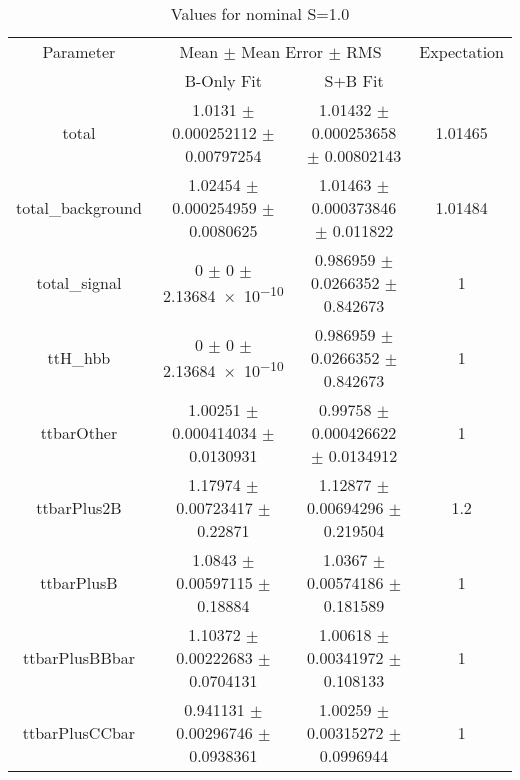 \begin{table}
\centering
\caption{Values for nominal S=1.0}
\begin{tabular}{cccc}
\toprule
Parameter & \multicolumn{2}{c}{Mean $\pm$ Mean Error $\pm$ RMS} & Expectation\\
 & B-Only Fit & S+B Fit & \\
\midrule
total & \num{1.0131} $\pm$ \num{0.000252112} $\pm$ \num{0.00797254} & \num{1.01432} $\pm$ \num{0.000253658} $\pm$ \num{0.00802143} & \num{1.01465}\\
total\_background & \num{1.02454} $\pm$ \num{0.000254959} $\pm$ \num{0.0080625} & \num{1.01463} $\pm$ \num{0.000373846} $\pm$ \num{0.011822} & \num{1.01484}\\
total\_signal & \num{0} $\pm$ \num{0} $\pm$ \num{2.13684e-10} & \num{0.986959} $\pm$ \num{0.0266352} $\pm$ \num{0.842673} & \num{1}\\
ttH\_hbb & \num{0} $\pm$ \num{0} $\pm$ \num{2.13684e-10} & \num{0.986959} $\pm$ \num{0.0266352} $\pm$ \num{0.842673} & \num{1}\\
ttbarOther & \num{1.00251} $\pm$ \num{0.000414034} $\pm$ \num{0.0130931} & \num{0.99758} $\pm$ \num{0.000426622} $\pm$ \num{0.0134912} & \num{1}\\
ttbarPlus2B & \num{1.17974} $\pm$ \num{0.00723417} $\pm$ \num{0.22871} & \num{1.12877} $\pm$ \num{0.00694296} $\pm$ \num{0.219504} & \num{1.2}\\
ttbarPlusB & \num{1.0843} $\pm$ \num{0.00597115} $\pm$ \num{0.18884} & \num{1.0367} $\pm$ \num{0.00574186} $\pm$ \num{0.181589} & \num{1}\\
ttbarPlusBBbar & \num{1.10372} $\pm$ \num{0.00222683} $\pm$ \num{0.0704131} & \num{1.00618} $\pm$ \num{0.00341972} $\pm$ \num{0.108133} & \num{1}\\
ttbarPlusCCbar & \num{0.941131} $\pm$ \num{0.00296746} $\pm$ \num{0.0938361} & \num{1.00259} $\pm$ \num{0.00315272} $\pm$ \num{0.0996944} & \num{1}\\
\bottomrule
\end{tabular}
\end{table}